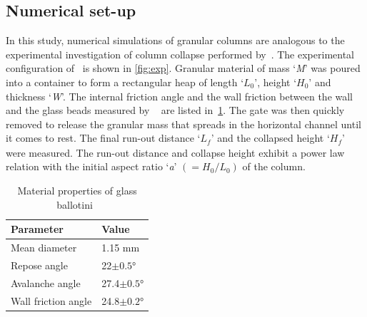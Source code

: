 \subsection{Numerical set-up}

In this study, numerical simulations of granular columns are analogous to the  
experimental investigation of column collapse performed
by~\citet{Lajeunesse2004}. The experimental configuration 
of~\citet{Lajeunesse2004} is shown in \cref{fig:exp}. Granular material of mass 
`\textit{M}' was poured into a container to form a rectangular heap of length 
`${L}_{\textit{0}}$', height `${H}_{\textit{0}}$' and thickness `\textit{W}'. 
The internal friction angle and the wall friction between the wall and the 
glass beads measured by ~\citet{Lajeunesse2004} are listed 
in~\cref{table:mat_prop}. The gate was then quickly removed to 
release the granular mass that spreads in the horizontal channel until it comes 
to rest. The final run-out distance `${L}_{\textit{f}}$' and the collapsed 
height `$H_{\textit{f}}$' were measured. The run-out distance and collapse 
height exhibit a power law relation with the initial aspect ratio 
`\textit{a}' $(=H_{\textit{0}}/L_{\textit{0}})$ of the column. 

\begin{table}[tbhp]
\caption{Material properties of glass ballotini~\citep{Lajeunesse2004}}
\label{table:mat_prop}
\centering
\begin{tabular}{ll}
\toprule
\textbf{Parameter} & \textbf{Value} \\ \midrule
Mean diameter & 1.15 \si{\mm} \\
Repose angle & 22$\pm 0.5$\si{\degree} \\
Avalanche angle & 27.4$\pm 0.5$\si{\degree} \\
Wall friction angle & 24.8$\pm 0.2$\si{\degree}\\
\bottomrule
\end{tabular}
\end{table}


